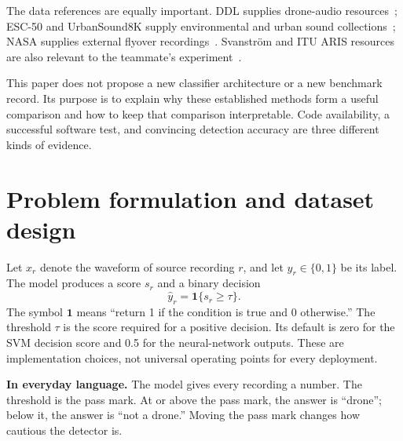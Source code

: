 \documentclass[11pt,letterpaper]{article}
\newcommand{\plain}[1]{\par\smallskip\noindent\textbf{In everyday language.} #1\par\smallskip}
\begin{document}
The data references are equally important. DDL supplies drone-audio
resources~\cite{ddl}; ESC-50 and UrbanSound8K supply environmental and urban
sound collections~\cite{esc50,urbansound}; NASA supplies external flyover
recordings~\cite{nasa}. Svanstr\"om and ITU ARIS resources are also relevant
to the teammate's experiment~\cite{svanstrom,ituaris}.

This paper does not propose a new classifier architecture or a new benchmark
record. Its purpose is to explain why these established methods form a useful
comparison and how to keep that comparison interpretable. Code availability,
a successful software test, and convincing detection accuracy are three
different kinds of evidence.

\section{Problem formulation and dataset design}
\label{sec:data}
Let $x_r$ denote the waveform of source recording $r$, and let $y_r\in\{0,1\}$
be its label. The model produces a score $s_r$ and a binary decision
\begin{equation}
 \widehat{y}_r=\mathbf{1}\{s_r\geq\tau\}.
 \label{eq:decision}
\end{equation}
The symbol $\mathbf{1}$ means ``return 1 if the condition is true and 0
otherwise.'' The threshold $\tau$ is the score required for a positive
decision. Its default is zero for the SVM decision score and 0.5 for the
neural-network outputs. These are implementation choices, not universal
operating points for every deployment.

\plain{The model gives every recording a number. The threshold is the pass
mark. At or above the pass mark, the answer is ``drone''; below it, the answer
is ``not a drone.'' Moving the pass mark changes how cautious the detector is.}
\end{document}
